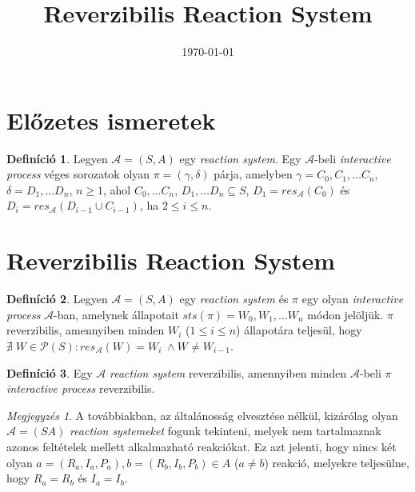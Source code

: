 \documentclass[12pt]{article}
\title{Reverzibilis Reaction System}
\date{\today}
\theoremstyle{definition}
\newtheorem*{definition*}{Definíció}
\theoremstyle{remark}
\newtheorem*{remark*}{Megjegyzés}
\theoremstyle{plain}
\begin{document}
    \maketitle

    \section*{Előzetes ismeretek}

    \begin{definition*}
        Legyen $\mathscr{A} = (S, A)$ egy \textit{reaction system}. Egy $\mathscr{A}$-beli \textit{interactive process} véges sorozatok olyan $\pi = (\gamma, \delta)$ párja, amelyben $\gamma = C_{0}, C_{1}, \ldots C_{n}$, $\delta = D_{1}, \ldots D_{n}$, $n \geq 1$, ahol $C_{0}, \ldots C_{n}$, $D_{1}, \ldots D_{n} \subseteq S$, $D_{1} = \textit{res}_{\mathscr{A}}(C_{0})$ és $D_{i} = \textit{res}_{\mathscr{A}}(D_{i - 1} \cup C_{i - 1})$, ha $2 \leq i \leq n$.
    \end{definition*}

    \section*{Reverzibilis Reaction System}

    \begin{definition*}
        Legyen $\mathscr{A} = (S, A)$ egy \textit{reaction system} és $\pi$ egy olyan \textit{interactive process} $\mathscr{A}$-ban, amelynek állapotait $\textit{sts}(\pi)=W_{0},W_{1},\ldots W_{n}$ módon jelöljük. $\pi$ reverzibilis, amennyiben minden $W_{i}$ ($1 \leq i \leq n$) állapotára teljesül, hogy $\nexists \; W \in \mathcal{P}(S) : res_{\mathscr{A}}(W) = W_{i} \; \wedge W \neq W_{i - 1}$.
    \end{definition*}

    \begin{definition*}
        Egy $\mathscr{A}$ \textit{reaction system} reverzibilis, amennyiben minden $\mathscr{A}$-beli $\pi$ \textit{interactive process} reverzibilis.
    \end{definition*}

    \begin{remark*}
        A továbbiakban, az általánosság elvesztése nélkül, kizárólag olyan $\mathscr{A} = (S A)$ \textit{reaction systemeket} fogunk tekinteni, melyek nem tartalmaznak azonos feltételek mellett alkalmazható reakciókat. Ez azt jelenti, hogy nincs két olyan $a = (R_{a}, I_{a}, P_{a}), b = (R_{b}, I_{b}, P_{b}) \in A$ ($a \neq b$) reakció, melyekre teljesülne, hogy $R_{a} = R_{b}$ és $I_{a} = I_{b}$.
    \end{remark*}
\end{document}
